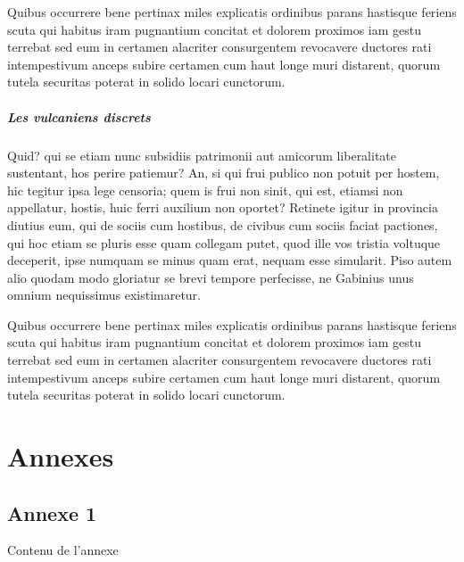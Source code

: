 \documentclass{framatexclass}
\begin{document}
Quibus occurrere bene pertinax miles explicatis ordinibus parans hastisque feriens scuta qui habitus iram pugnantium concitat et dolorem proximos iam gestu terrebat sed eum in certamen alacriter consurgentem revocavere ductores rati intempestivum anceps subire certamen cum haut longe muri distarent, quorum tutela securitas poterat in solido locari cunctorum.


\subsubsection{Les vulcaniens discrets}
Quid? qui se etiam nunc subsidiis patrimonii aut amicorum liberalitate sustentant, hos perire patiemur? An, si qui frui publico non potuit per hostem, hic tegitur ipsa lege censoria; quem is frui non sinit, qui est, etiamsi non appellatur, hostis, huic ferri auxilium non oportet? Retinete igitur in provincia diutius eum, qui de sociis cum hostibus, de civibus cum sociis faciat pactiones, qui hoc etiam se pluris esse quam collegam putet, quod ille vos tristia voltuque deceperit, ipse numquam se minus quam erat, nequam esse simularit. Piso autem alio quodam modo gloriatur se brevi tempore perfecisse, ne Gabinius unus omnium nequissimus existimaretur.

Quibus occurrere bene pertinax miles explicatis ordinibus parans hastisque feriens scuta qui habitus iram pugnantium concitat et dolorem proximos iam gestu terrebat sed eum in certamen alacriter consurgentem revocavere ductores rati intempestivum anceps subire certamen cum haut longe muri distarent, quorum tutela securitas poterat in solido locari cunctorum.
                        
                        
%


\appendix
\part*{Annexes}

 
\chapter{Annexe 1}



%

                    

Contenu de l'annexe
\end{document}
